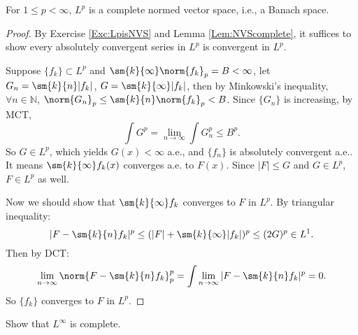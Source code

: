 \begin{thm}
    For $1\le p<\infty$, $L^{p}$ is a complete normed vector space, 
    i.e., a Banach space.
\end{thm}
\begin{proof}
    By Exercise \ref{Exc:LpisNVS} and 
    Lemma \ref{Lem:NVScomplete}, it suffices to show 
    every absolutely convergent series in $L^{p}$ 
    is convergent in $L^{p}$. 

    Suppose $\{f_{k}\}\subset L^{p}$ and 
    $\sm{k}{\infty}\norm{f_{k}}_{p}=B<\infty$, let 
    $G_{n}=\sm{k}{n}|f_{k}|$, $G=\sm{k}{\infty}|f_{k}|$, then 
    by Minkowski's inequality, 
    $\forall n\in\mathbb{N}$, 
    $\norm{G_{n}}_{p}\le\sm{k}{n}\norm{f_{k}}_{p}<B$. 
    Since $\{G_{n}\}$ is increasing, by MCT, 
    \begin{displaymath}
        \int G^{p}=\lim_{n\rightarrow\infty}\int G_{n}^{p}
        \le B^{p}.
    \end{displaymath}
    So $G\in L^{p}$, which yields $G(x)<\infty$ a.e., and 
    $\{f_{n}\}$ is absolutely convergent a.e.. 
    It means $\sm{k}{\infty}f_{k}(x)$ converges a.e. to $F(x)$. 
    Since $|F|\le G$ and $G\in L^{p}$, $F\in L^{p}$ as well. 

    Now we should show that $\sm{k}{\infty}f_{k}$ 
    converges to $F$ in $L^{p}$. 
    By triangular inequality:
    \begin{displaymath}
        |F-\sm{k}{n}f_{k}|^{p}
        \le(|F|+\sm{k}{\infty}|f_{k}|)^{p}
        \le(2G)^{p}\in L^{1}.
    \end{displaymath}
    Then by DCT:
    \begin{displaymath}
        \lim_{n\rightarrow\infty}\norm{F-\sm{k}{n}f_{k}}_{p}^{p}
        =\int\lim_{n\rightarrow\infty}|F-\sm{k}{n}f_{k}|^{p}
        =0.
    \end{displaymath}
    So $\{f_{k}\}$ converges to $F$ in $L^{p}$.
\end{proof}
\begin{exc}
    Show that $L^{\infty}$ is complete.
\end{exc}
